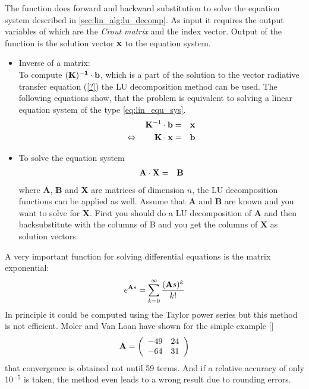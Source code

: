 The function  does forward and backward
substitution to solve the equation system described in
\ref{sec:lin_alg:lu_decomp}. As input it requires the output variables of
 which are the {\sl Crout matrix} and the index
vector. Output of the function is the solution vector ${\bf x}$ to the
equation system.


\label{lu_applications}

\begin{itemize}
\item Inverse of a matrix:\\
  To compute $(\bf K)^{-1}\cdot{\bf b}$, which is a part of the
solution to the vector radiative transfer equation (\ref{?}) the LU
decomposition method can be used. The following equations show, that
the problem is equivalent to  solving a linear equation system of the type
\ref{eq:lin_equ_sys}.
\begin{eqnarray}
  {\bf K}^{-1}\cdot{\bf b} &=& {\bf x}\\
\Leftrightarrow \qquad  {\bf K}\cdot{\bf x} &=& {\bf b}
\end{eqnarray}

\item To solve the equation system
  \begin{eqnarray}
    {\bf A}\cdot{\bf X} &=& {\bf B}
  \end{eqnarray}
where {\bf A}, {\bf B} and  {\bf X} are matrices of dimension
$n$, the LU decomposition functions can be applied as well. Assume
that {\bf A} and {\bf B} are known and you want to solve for {\bf
 X}.
First you should do a LU decomposition of  {\bf A} and then
backsubstitute with the columns of B and you get the columns of {\bf
  X} as solution vectors.

\end{itemize}

\label{sec:lin_alg:mat_exp}

A very important function for solving differential equations is the
matrix exponential:
\begin{eqnarray}
  \label{eq:mat_exp}
  e^{{\bf A}s} = \sum_{k=0}^\infty{\frac{({\bf A} s)^k}{k!}}
\end{eqnarray}
In principle it could be computed using the Taylor power series but 
 this method is not efficient. {\sc Moler} and {\sc Van
  Loan} have shown for the simple example [\cite{Moler_Loan:79}]
\[ {\bf A} =
\left(
  \begin{array}{cc}
    -49 & 24\\
    -64 & 31
    \end{array} \right) \]
that convergence is obtained not until 59 terms. And if a relative
accuracy of only 10$^{-5}$ is taken, the method even leads to a wrong
result due to rounding errors.

